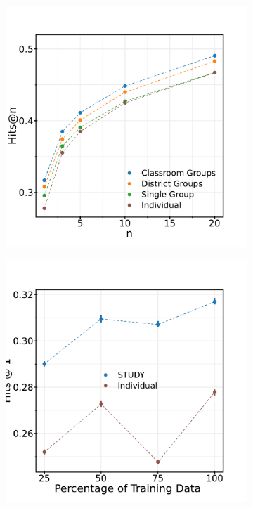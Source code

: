 \documentclass{article}
\begin{document}
\begin{figure}[]
  \centering
    \begin{subfigure}[t]{0.4\linewidth}
        \includegraphics[width=\linewidth]{figures/classroom_ablation.pdf}
        \caption{}
        \label{fig:classroom_ablation}
    \end{subfigure}
    \begin{subfigure}[t]{0.4\linewidth}
        \includegraphics[width=\linewidth]{figures/data_tapering.pdf}

\end{subfigure}
\end{figure}
\end{document}
